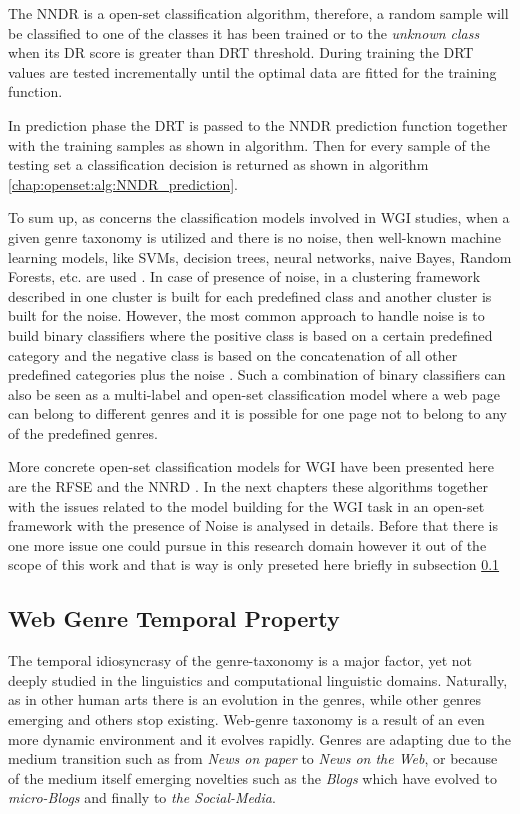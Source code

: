 The NNDR is a open-set classification algorithm, therefore, a random sample will be classified to one of the classes it has been trained or to the \textit{unknown class} when its DR score is greater than DRT threshold. During training the DRT values are tested incrementally until the optimal data are fitted for the training function.

In prediction phase the DRT is passed to the NNDR prediction function together with the training samples as shown in algorithm. Then for every sample of the testing set a classification decision is returned as shown in algorithm \ref{chap:openset:alg:NNDR_prediction}.

To sum up, as concerns the classification models involved in WGI studies, when a given genre taxonomy is utilized and there is no noise, then well-known machine learning models, like SVMs, decision trees, neural networks, naive Bayes, Random Forests, etc. are used \parencite{Lim2005,santini2007automatic,kanaris2009learning,jebari2015combination,sharoff2010web}. In case of presence of noise, in a clustering framework described in \parencite{kennedy2005automatic} one cluster is built for each predefined class and another cluster is built for the noise. However, the most common approach to handle noise is to build binary classifiers where the positive class is based on a certain predefined category and the negative class is based on the concatenation of all other predefined categories plus the noise \parencite{kennedy2005automatic,dong2006binary,levering2008using}. Such a combination of binary classifiers can also be seen as a multi-label and open-set classification model where a web page can belong to different genres and it is possible for one page not to belong to any of the predefined genres. 

More concrete open-set classification models for WGI have been presented here are the RFSE and the NNRD . In the  next chapters these algorithms together with the issues related to the model building for the WGI task in an open-set framework with the presence of Noise is analysed in details. Before that there is one more issue one could pursue in this research domain however it out of the scope of this work and that is way is only preseted here briefly in subsection \ref{chap:relevant_work:sec:temporal_wgi}

\subsection{Web Genre Temporal Property}
\label{chap:relevant_work:sec:temporal_wgi}
The temporal idiosyncrasy of the genre-taxonomy is a major factor, yet not deeply studied in the linguistics and computational linguistic domains. Naturally, as in other human arts there is an evolution in the genres, while other genres emerging and others stop existing. Web-genre taxonomy is a result of an even more dynamic environment and it evolves rapidly. Genres are adapting due to the medium transition such as from \textit{News on paper} to \textit{News on the Web}, or because of the medium itself emerging novelties such as the \textit{Blogs} which have evolved to\textit{ micro-Blogs} and finally to \textit{the Social-Media}. 


